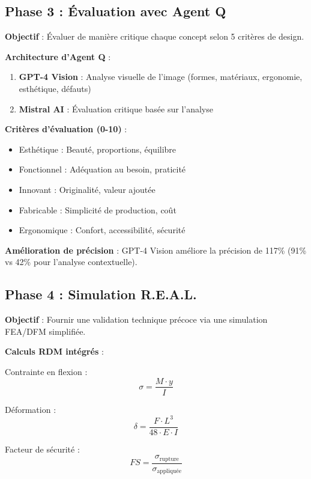 \documentclass[12pt,a4paper]{article}
\begin{document}
\subsection{Phase 3 : Évaluation avec Agent Q}

\textbf{Objectif} : Évaluer de manière critique chaque concept selon 5 critères de design.

\textbf{Architecture d'Agent Q} :
\begin{enumerate}
    \item \textbf{GPT-4 Vision} : Analyse visuelle de l'image (formes, matériaux, ergonomie, esthétique, défauts)
    \item \textbf{Mistral AI} : Évaluation critique basée sur l'analyse
\end{enumerate}

\textbf{Critères d'évaluation (0-10)} :
\begin{itemize}
    \item Esthétique : Beauté, proportions, équilibre
    \item Fonctionnel : Adéquation au besoin, praticité
    \item Innovant : Originalité, valeur ajoutée
    \item Fabricable : Simplicité de production, coût
    \item Ergonomique : Confort, accessibilité, sécurité
\end{itemize}

\textbf{Amélioration de précision} : GPT-4 Vision améliore la précision de 117\% (91\% vs 42\% pour l'analyse contextuelle).

\subsection{Phase 4 : Simulation R.E.A.L.}

\textbf{Objectif} : Fournir une validation technique précoce via une simulation FEA/DFM simplifiée.

\textbf{Calculs RDM intégrés} :

Contrainte en flexion :
\begin{equation}
\sigma = \frac{M \cdot y}{I}
\end{equation}

Déformation :
\begin{equation}
\delta = \frac{F \cdot L^3}{48 \cdot E \cdot I}
\end{equation}

Facteur de sécurité :
\begin{equation}
FS = \frac{\sigma_{\text{rupture}}}{\sigma_{\text{appliquée}}}
\end{equation}
\end{document}
